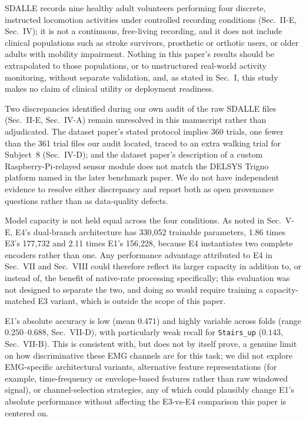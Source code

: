 \documentclass[conference]{IEEEtran}
\begin{document}
SDALLE records nine healthy adult volunteers performing four
discrete, instructed locomotion activities under controlled recording
conditions (Sec.~II-E, Sec.~IV); it is not a continuous, free-living
recording, and it does not include clinical populations such as
stroke survivors, prosthetic or orthotic users, or older adults with
mobility impairment. Nothing in this paper's results should be
extrapolated to those populations, or to unstructured real-world
activity monitoring, without separate validation, and, as stated in
Sec.~I, this study makes no claim of clinical utility or deployment
readiness.

Two discrepancies identified during our own audit of the raw SDALLE
files (Sec.~II-E, Sec.~IV-A) remain unresolved in this manuscript
rather than adjudicated. The dataset paper's stated protocol implies
360 trials, one fewer than the 361 trial files our audit located,
traced to an extra walking trial for Subject~8 (Sec.~IV-D); and the
dataset paper's description of a custom Raspberry-Pi-relayed sensor
module does not match the DELSYS Trigno platform named in the later
benchmark paper. We do not have independent evidence to resolve
either discrepancy and report both as open provenance questions
rather than as data-quality defects.

Model capacity is not held equal across the four conditions. As noted
in Sec.~V-E, E4's dual-branch architecture has 330{,}052 trainable
parameters, 1.86 times E3's 177{,}732 and 2.11 times E1's 156{,}228,
because E4 instantiates two complete encoders rather than one. Any
performance advantage attributed to E4 in Sec.~VII and Sec.~VIII
could therefore reflect its larger capacity in addition to, or
instead of, the benefit of native-rate processing specifically; this
evaluation was not designed to separate the two, and doing so would
require training a capacity-matched E3 variant, which is outside the
scope of this paper.

E1's absolute accuracy is low (mean $0.471$) and highly variable
across folds (range $0.250$--$0.688$, Sec.~VII-D), with particularly
weak recall for \texttt{Stairs\_up} ($0.143$, Sec.~VII-B). This is
consistent with, but does not by itself prove, a genuine limit on how
discriminative these EMG channels are for this task; we did not
explore EMG-specific architectural variants, alternative feature
representations (for example, time-frequency or envelope-based
features rather than raw windowed signal), or channel-selection
strategies, any of which could plausibly change E1's absolute
performance without affecting the E3-vs-E4 comparison this paper is
centered on.
\end{document}
